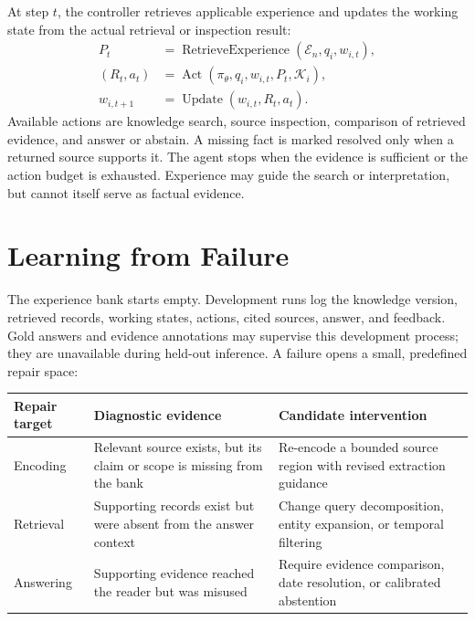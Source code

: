 \documentclass{article}
\newcommand{\KB}{\mathcal{K}}
\newcommand{\EB}{\mathcal{E}}
\newcommand{\WM}{w}
\newcommand{\Model}{\pi_{\theta}}
\begin{document}
At step $t$, the controller retrieves applicable experience and updates the
working state from the actual retrieval or inspection result:
\begin{equation}
\begin{split}
 P_t &= \operatorname{RetrieveExperience}(\EB_n,q_i,\WM_{i,t}),\\
 (R_t,a_t) &= \operatorname{Act}(\Model,q_i,\WM_{i,t},P_t,\KB_i),\\
 \WM_{i,t+1} &= \operatorname{Update}(\WM_{i,t},R_t,a_t).
\end{split}
\end{equation}
Available actions are knowledge search, source inspection, comparison of
retrieved evidence, and answer or abstain. A missing fact is marked resolved
only when a returned source supports it. The agent stops when the evidence is
sufficient or the action budget is exhausted. Experience may guide the search
or interpretation, but cannot itself serve as factual evidence.

\section{Learning from Failure}
\label{sec:learning}
The experience bank starts empty. Development runs log the knowledge version, retrieved records, working
states, actions, cited sources, answer, and feedback. Gold answers and evidence
annotations may supervise this development process; they are unavailable during
held-out inference. A failure opens a small, predefined repair space:

\begin{center}
\small
\begin{tabularx}{\linewidth}{@{}p{2.0cm}XX@{}}
\toprule
Repair target & Diagnostic evidence & Candidate intervention \\
\midrule
Encoding & Relevant source exists, but its claim or scope is missing from the bank & Re-encode a bounded source region with revised extraction guidance \\
Retrieval & Supporting records exist but were absent from the answer context & Change query decomposition, entity expansion, or temporal filtering \\
Answering & Supporting evidence reached the reader but was misused & Require evidence comparison, date resolution, or calibrated abstention \\
\bottomrule
\end{tabularx}
\end{center}
\end{document}
